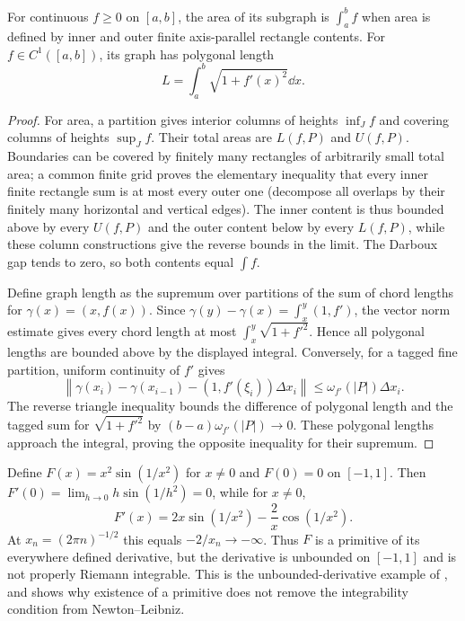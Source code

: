 \begin{theorem}
For continuous $f\ge0$ on $[a,b]$, the area of its subgraph is $\int_a^bf$
when area is defined by inner and outer finite axis-parallel rectangle
contents. For $f\in C^1([a,b])$, its graph has polygonal length
\[L=\int_a^b\sqrt{1+f'(x)^2}\dd x.
\]
\end{theorem}
\begin{proof}
For area, a partition gives interior columns of heights $\inf_J f$ and
covering columns of heights $\sup_J f$. Their total areas are $L(f,P)$
and $U(f,P)$. Boundaries can be covered by finitely many rectangles
of arbitrarily small total area; a common finite grid proves the elementary
inequality that every inner finite rectangle sum is at most every outer
one (decompose all overlaps by their finitely many horizontal and vertical
edges). The inner content is thus bounded above by every $U(f,P)$ and
the outer content below by every $L(f,P)$, while these column constructions
give the reverse bounds in the limit. The Darboux gap tends to zero,
so both contents equal $\int f$.

Define graph length as the supremum over partitions of the sum of chord
lengths for $\gamma(x)=(x,f(x))$. Since
$\gamma(y)-\gamma(x)=\int_x^y(1,f')$, the vector norm estimate gives
every chord length at most $\int_x^y\sqrt{1+f'^2}$. Hence all polygonal
lengths are bounded above by the displayed integral. Conversely, for a
tagged fine partition, uniform continuity of $f'$ gives
\[\left\|\gamma(x_i)-\gamma(x_{i-1})
-(1,f'(\xi_i))\Delta x_i\right\|
\le\omega_{f'}(|P|)\Delta x_i.
\]
The reverse triangle inequality bounds the difference of polygonal length
and the tagged sum for $\sqrt{1+f'^2}$ by
$(b-a)\omega_{f'}(|P|)\to0$. These polygonal lengths approach the
integral, proving the opposite inequality for their supremum.
\end{proof}

\begin{example}
Define $F(x)=x^2\sin(1/x^2)$ for $x\ne0$ and $F(0)=0$ on $[-1,1]$.
Then $F'(0)=\lim_{h\to0}h\sin(1/h^2)=0$, while for $x\ne0$,
\[F'(x)=2x\sin(1/x^2)-\frac2x\cos(1/x^2).
\]
At $x_n=(2\pi n)^{-1/2}$ this equals $-2/x_n\to-\infty$.
Thus $F$ is a primitive of its everywhere defined derivative, but the
derivative is unbounded on $[-1,1]$ and is not properly Riemann integrable.
This is the unbounded-derivative example of ,
and shows why existence of a primitive does not remove the integrability
condition from Newton--Leibniz.
\end{example}
